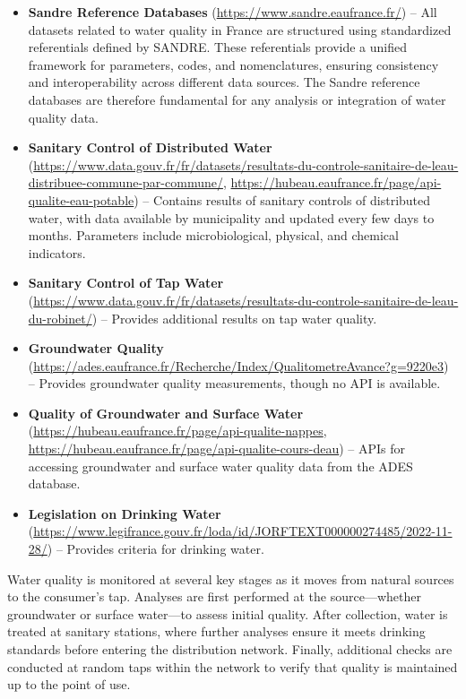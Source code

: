 \documentclass{article}
\begin{document}
\begin{itemize}
    \item \textbf{Sandre Reference Databases} (\url{https://www.sandre.eaufrance.fr/}) 
        -- All datasets related to water quality in France are structured using standardized referentials defined by SANDRE. 
        These referentials provide a unified framework for parameters, codes, and nomenclatures, ensuring consistency 
        and interoperability across different data sources. The Sandre reference databases are therefore fundamental 
        for any analysis or integration of water quality data.
    \item \textbf{Sanitary Control of Distributed Water} (\url{https://www.data.gouv.fr/fr/datasets/resultats-du-controle-sanitaire-de-leau-distribuee-commune-par-commune/}, 
        \url{https://hubeau.eaufrance.fr/page/api-qualite-eau-potable}) 
        -- Contains results of sanitary controls of distributed water, with data available by municipality and updated 
        every few days to months. Parameters include microbiological, physical, and chemical indicators.
    \item \textbf{Sanitary Control of Tap Water} (\url{https://www.data.gouv.fr/fr/datasets/resultats-du-controle-sanitaire-de-leau-du-robinet/}) 
        -- Provides additional results on tap water quality.
    \item \textbf{Groundwater Quality} (\url{https://ades.eaufrance.fr/Recherche/Index/QualitometreAvance?g=9220e3}) 
        -- Provides groundwater quality measurements, though no API is available.
    \item \textbf{Quality of Groundwater and Surface Water} (\url{https://hubeau.eaufrance.fr/page/api-qualite-nappes}, 
        \url{https://hubeau.eaufrance.fr/page/api-qualite-cours-deau}) 
        -- APIs for accessing groundwater and surface water quality data from the ADES database.
    \item \textbf{Legislation on Drinking Water} (\url{https://www.legifrance.gouv.fr/loda/id/JORFTEXT000000274485/2022-11-28/}) 
        -- Provides criteria for drinking water.
\end{itemize}

Water quality is monitored at several key stages as it moves from natural sources to the consumer's tap. 
Analyses are first performed at the source—whether groundwater or surface water—to assess initial quality. 
After collection, water is treated at sanitary stations, where further analyses ensure it meets drinking standards 
before entering the distribution network. Finally, additional checks are conducted at random taps within 
the network to verify that quality is maintained up to the point of use.
\end{document}

